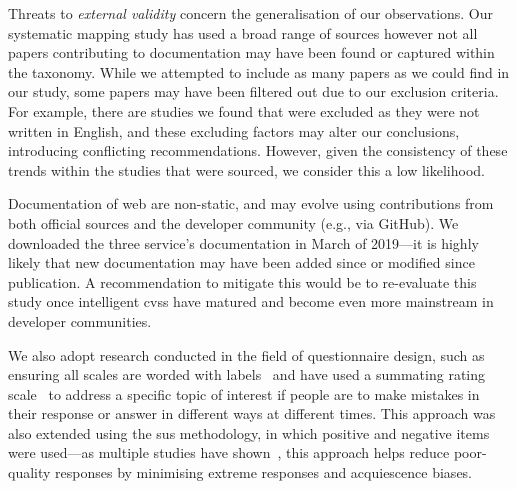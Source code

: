 Threats to \textit{external validity} concern the generalisation of our observations. Our systematic mapping study has used a broad range of sources however not all papers contributing to  documentation may have been found or captured within the taxonomy. While we attempted to include as many papers as we could find in our study, some papers may have been filtered out due to our exclusion criteria. For example, there are studies we found that were excluded as they were not written in English, and these excluding factors may alter our conclusions, introducing conflicting recommendations. However, given the consistency of these trends within the studies that were sourced, we consider this a low likelihood.

Documentation of web  are non-static, and may evolve using contributions from both official sources and the developer community (e.g., via GitHub). We downloaded the three service's  documentation in March of 2019---it is highly likely that new documentation may have been added since or modified since publication. A recommendation to mitigate this would be to re-evaluate this study once intelligent \glspl{cvs} have matured and become even more mainstream in developer communities.


We also adopt research conducted in the field of questionnaire design, such as ensuring all scales are worded with labels~\citep{Krosnick:1999wt} and have used a summating rating scale~\citep{Spector:1992uj} to address a specific topic of interest if people are to make mistakes in their response or answer in different ways at different times. This approach was also extended using the \gls{sus} methodology, in which positive and negative items were used---as multiple studies have shown~\citep{Sauro:2011aj,Brooke:2013vt}, this approach helps reduce poor-quality responses by minimising extreme responses and acquiescence biases. 

